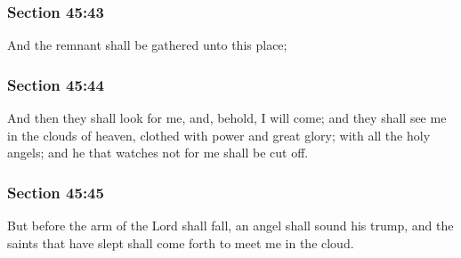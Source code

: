 	\subsubsection{Section 45:43} %
		\label{DC45-43}

		And the remnant shall be gathered unto this place;


	\subsubsection{Section 45:44} %
		\label{DC45-44}

		And then they shall look for me, and, behold, I will come; and they shall see me in the clouds of heaven, clothed with power and great glory; with all the holy angels; and he that watches not for me shall be cut off.


	\subsubsection{Section 45:45} %
		\label{DC45-45}

		But before the arm of the Lord shall fall, an angel shall sound his trump, and the saints that have slept shall come forth to meet me in the cloud.


